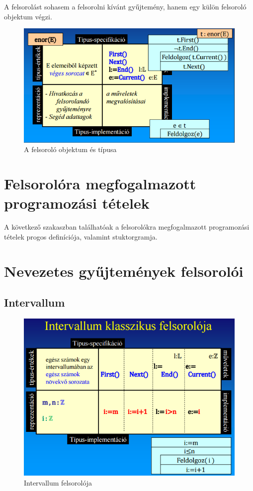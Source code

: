 \documentclass[12pt,margin=0px]{article}
\begin{document}
	A felsorolást sohasem a felsorolni kívánt gyűjtemény, hanem egy külön felsoroló objektum végzi.

	\begin{figure}[H]
		\centering
		\includegraphics[width=0.7\linewidth]{img/felsorolo_speci}
		\caption{A felsoroló objektum és típusa}
		\label{fig:felsorolas_stuki}
	\end{figure}

	\section*{Felsorolóra megfogalmazott programozási tételek}
	
    A következő szakaszban találhatóak a felsorolókra megfogalmazott programozási tételek progos definíciója, valamint stuktorgramja.

	
	
	\section*{Nevezetes gyűjtemények felsorolói}
	
	\subsection*{Intervallum}
		\begin{figure}[H]
			\centering
			\includegraphics[width=0.75\linewidth]{img/felsorolo_intervallum}
			\caption{Intervallum felsorolója}
			\label{fig:felsorolo_intervallum}
		\end{figure}
	
\end{document}
